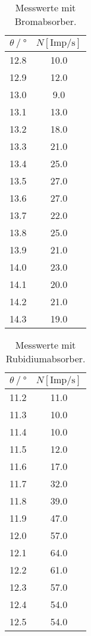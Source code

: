   \begin{table}
    \centering
    \caption{Messwerte mit Bromabsorber.}
    \label{tab:bromtab}
    \begin{tabular}{c c}
      \toprule
      $\theta \mathbin{/}°$ & $N [\text{Imp}/\si{\s}]$ \\
      \midrule
      12.8	& 10.0 \\
      12.9	& 12.0 \\
      13.0	& 9.0 \\
      13.1	& 13.0 \\
      13.2	& 18.0 \\
      13.3	& 21.0 \\
      13.4	& 25.0 \\
      13.5	& 27.0 \\
      13.6	& 27.0 \\
      13.7	& 22.0 \\
      13.8	& 25.0 \\
      13.9	& 21.0 \\
      14.0	& 23.0 \\
      14.1	& 20.0 \\
      14.2	& 21.0 \\
      14.3	& 19.0 \\
      \bottomrule
    \end{tabular}
  \end{table}

  \begin{table}
    \centering
    \caption{Messwerte mit Rubidiumabsorber.}
    \label{tab:rubidiumtab}
    \begin{tabular}{c c}
      \toprule
      $\theta \mathbin{/}°$ & $N [\text{Imp}/\si{\s}]$ \\
      \midrule
      11.2	& 11.0 \\
      11.3	& 10.0 \\
      11.4	& 10.0 \\
      11.5	& 12.0 \\
      11.6	& 17.0 \\
      11.7	& 32.0 \\
      11.8	& 39.0 \\
      11.9	& 47.0 \\
      12.0	& 57.0 \\
      12.1	& 64.0 \\
      12.2	& 61.0 \\
      12.3	& 57.0 \\
      12.4	& 54.0 \\
      12.5	& 54.0 \\
      \bottomrule
    \end{tabular}
  \end{table}

